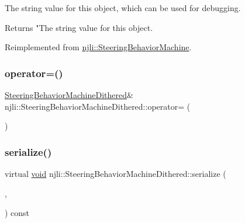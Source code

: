 The string value for this object, which can be used for debugging.

\begin{DoxyReturn}{Returns}
"The string value for this object. 
\end{DoxyReturn}


Reimplemented from \mbox{\hyperlink{classnjli_1_1_steering_behavior_machine_a08dc60d265fe55badc0137c1a4427343}{njli\+::\+Steering\+Behavior\+Machine}}.

\mbox{\label{classnjli_1_1_steering_behavior_machine_dithered_a3e17391fe96d97e1731163912db7f941}} 
\subsubsection{\texorpdfstring{operator=()}{operator=()}}
{\footnotesize\ttfamily \mbox{\hyperlink{classnjli_1_1_steering_behavior_machine_dithered}{Steering\+Behavior\+Machine\+Dithered}}\& njli\+::\+Steering\+Behavior\+Machine\+Dithered\+::operator= (\begin{DoxyParamCaption}\item[{const \mbox{\hyperlink{classnjli_1_1_steering_behavior_machine_dithered}{Steering\+Behavior\+Machine\+Dithered}} \&}]{ }\end{DoxyParamCaption})\hspace{0.3cm}{\ttfamily [protected]}}

\mbox{\label{classnjli_1_1_steering_behavior_machine_dithered_afabe12bcb2005f23bd4f7a79bd758cf2}} 
\subsubsection{\texorpdfstring{serialize()}{serialize()}}
{\footnotesize\ttfamily virtual \mbox{\hyperlink{_thread_8h_af1e856da2e658414cb2456cb6f7ebc66}{void}} njli\+::\+Steering\+Behavior\+Machine\+Dithered\+::serialize (\begin{DoxyParamCaption}\item[{\mbox{\hyperlink{_thread_8h_af1e856da2e658414cb2456cb6f7ebc66}{void}} $\ast$}]{,  }\item[{bt\+Serializer $\ast$}]{ }\end{DoxyParamCaption}) const\hspace{0.3cm}{\ttfamily [virtual]}}

